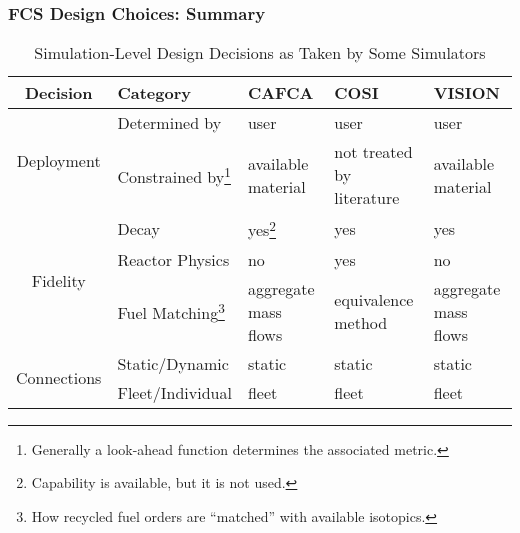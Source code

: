 \begin{frame}[ctb!]
  \frametitle{FCS Design Choices: Summary}

  \fontsize{7pt}{\baselineskip}\selectfont
  
  \begin{table} [h!]
    \begin{tabularx}{\textwidth}{|c|X|X|X|X|}
      \hline
      Decision                     & Category & CAFCA & COSI & VISION \\ 
      \hline
      \multirow{2}{*}{Deployment}  & Determined by 
      & user & user & user \\ \cline{2-5}
      & Constrained by\footnote{Generally a look-ahead function determines the associated metric.}   
      & available material & not treated by literature & available material \\ \hline
      \multirow{3}{*}{Fidelity}    & Decay 
      & yes\footnote{Capability is available, but it is not used.} & yes & yes \\ \cline{2-5}
      & Reactor Physics 
      & no & yes & no \\ \cline{2-5}
      & Fuel Matching\footnote{How recycled fuel orders are ``matched'' with available isotopics.} 
      & aggregate mass flows & equivalence method & aggregate mass flows \\ \hline
      \multirow{2}{*}{Connections} & Static/Dynamic 
      & static & static & static \\ \cline{2-5}
      & Fleet/Individual 
      & fleet & fleet & fleet \\
      \hline
    \end{tabularx}
    \caption{Simulation-Level Design Decisions as Taken by Some Simulators}
    \label{tab:sim-summary}
  \end{table}

\end{frame}
